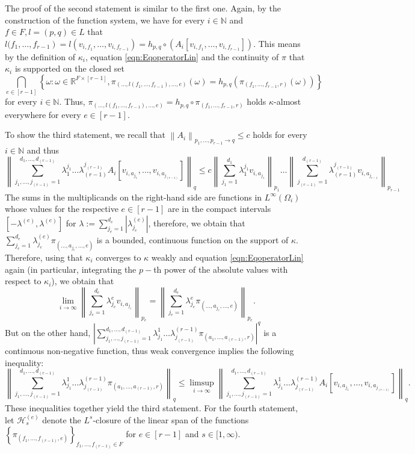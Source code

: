 \documentclass[11pt]{article}
\begin{document}
The proof of the second statement is similar to the first one. Again, by the construction of the function system, we have for every $i \in \mathbb{N}$ and $f \in F, l=(p, q) \in L$ that $\left.l(f_1,\ldots,f_{r-1}\right)=l\left(v_{i, f_1},\ldots,v_{i, f_{r-1}}\right)=h_{p, q} \circ\left( A_{i}[v_{i,f_1},\ldots, v_{i,f_{r-1}}]\right)$. This means by the definition of $\kappa_{i}$, equation \eqref{eqn:EqoperatorLin} and the continuity of $\pi$ that $\kappa_{i}$ is supported on the closed set
$$
\bigcap_{e\in [r-1] } \left\{\omega: \omega \in \mathbb{R}^{F \times [r-1]}, \pi_{(\ldots, l(f_1,\ldots,f_{r-1}),\ldots, e)}(\omega)=h_{p, q}\left(\pi_{(f_1,\ldots,f_{r-1}, r)}(\omega)\right)\right\}
$$
for every $i \in \mathbb{N}$. Thus, $\pi_{(\ldots,l(f_1,\ldots, f_{r-1}),\ldots, e)}=h_{p, q} \circ \pi_{(f_1,\ldots,f_{r-1}, r)}$ holds $\kappa$-almost everywhere for every $e\in [r-1]$.


To show the third statement, we recall that $\left\|A_{i}\right\|_{p_1,\ldots, p_{r-1} \rightarrow q} \leq c$ holds for every $i \in \mathbb{N}$ and thus
$$
\left\|\sum_{j_1,\ldots, j_{(r-1)}=1}^{d_1,\ldots,d_{(r-1)}} \lambda_1^{j_1}\ldots\lambda_{(r-1)}^{j_{(r-1)}} A_{i}[v_{i, a_{j_1}},\ldots, v_{i, a_{j_{(r-1)}}}]\right\|_{q} \leq c\left\|\sum_{j_1=1}^{d_1} \lambda_1^{j_1} v_{i, a_{j_1}}\right\|_{p_1}\ldots\left\|\sum_{j_{(r-1)}=1}^{d_{(r-1)}} \lambda_{(r-1)}^{j_{(r-1)}} v_{i, a_{j_{r-1}}}\right\|_{p_{r-1}}
$$The sums in the multiplicands on the right-hand side are functions in $L^{\infty}\left(\Omega_{i}\right)$ whose values for the respective $e\in [r-1]$ are in the compact intervals $[-\lambda^{(e)}, \lambda^{(e)}]$ for $\lambda:=\sum_{j_e=1}^{d_e}\left|\lambda^{(e)}_{j_e}\right|$, therefore, we obtain that $\sum_{j_e=1}^{d_e} \lambda^{(e)}_{j_e} \pi_{\left(\ldots,a_{j_e},\ldots , e\right)}$ is a bounded, continuous function on the support of $\kappa$. Therefore, using that  $\kappa_{i} $ converges to $\kappa$ weakly and equation \eqref{eqn:EqoperatorLin} again (in particular, integrating the $p-$th power of the absolute values with respect to $\kappa_{i}$), we obtain that
$$
\lim _{i \rightarrow \infty}\left\|\sum_{j_e=1}^{d_e} \lambda^e_{j_e} v_{i, a_{j_e}}\right\|_{p_e}=\left\|\sum_{j_e=1}^{d_e} \lambda^e_{j_e} \pi_{\left(\ldots,a_{j_e},\ldots, e\right)}\right\|_{p_e}.
$$
But on the other hand, $\left|\sum_{j_1,\ldots,j_{(r-1)}=1}^{d_1,\ldots,d_{(r-1)}} \lambda^1_{j_1} \ldots \lambda^{(r-1)}_{j_{(r-1)}}\pi_{(a_1,\ldots,a_{(r-1)}, r)}\right|^{q}$ is a continuous non-negative function, thus weak convergence implies the following inequality:
$$
\left\|\sum_{j_1,\ldots,j_{(r-1)}=1}^{d_1,\ldots,d_{(r-1)}} \lambda^1_{j_1} \ldots \lambda^{(r-1)}_{j_{(r-1)}}\pi_{(a_1,\ldots,a_{(r-1)}, r)}\right\|_{q} \leq \limsup _{i \rightarrow \infty}\left\|\sum_{j_1,\ldots,j_{(r-1)}=1}^{d_1,\ldots,d_{(r-1)}}\lambda^1_{j_1} \ldots \lambda^{(r-1)}_{j_{(r-1)}}A_{i}[v_{i, a_{j_1}},\ldots, v_{i, a_{j_{(r-1)}}}]\right\|_{q} .
$$These inequalities together yield the third statement.
For the fourth statement, let $\mathcal{H}^{(e)}_{s}$ denote the $L^{s}$-closure of the linear span of the functions $\left\{\pi_{(f_1,\ldots,f_{(r-1)}, e)}\right\}_{f_1,\ldots, f_{(r-1)} \in F}$ for $e\in [r-1]$  and $s \in[1, \infty)$. 
\end{document}
